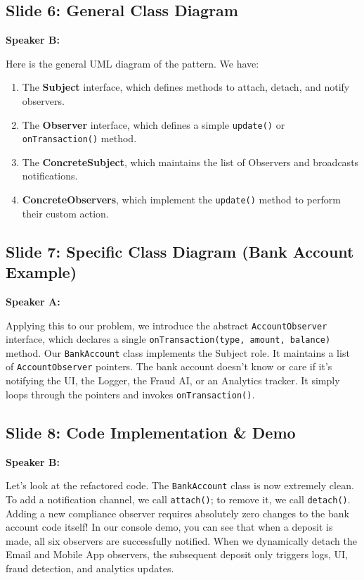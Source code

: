 \documentclass[11pt,a4paper]{article}
\newenvironment{dialogue}[1]{
    \begin{mdframed}[linecolor=gray!40,backgroundcolor=gray!5,roundcorner=5pt,innerleftmargin=10pt,innerrightmargin=10pt,innertopmargin=8pt,innerbottommargin=8pt]
    \textbf{#1:}
}{
    \end{mdframed}
}
\begin{document}
\subsection*{Slide 6: General Class Diagram}
\begin{dialogue}{Speaker B}
    Here is the general UML diagram of the pattern. We have:
    \begin{enumerate}
        \item The \textbf{Subject} interface, which defines methods to attach, detach, and notify observers.
        \item The \textbf{Observer} interface, which defines a simple \texttt{update()} or \texttt{onTransaction()} method.
        \item The \textbf{ConcreteSubject}, which maintains the list of Observers and broadcasts notifications.
        \item \textbf{ConcreteObservers}, which implement the \texttt{update()} method to perform their custom action.
    \end{enumerate}
\end{dialogue}

\subsection*{Slide 7: Specific Class Diagram (Bank Account Example)}
\begin{dialogue}{Speaker A}
    Applying this to our problem, we introduce the abstract \texttt{AccountObserver} interface, which declares a single \texttt{onTransaction(type, amount, balance)} method. 
    Our \texttt{BankAccount} class implements the Subject role. It maintains a list of \texttt{AccountObserver} pointers. The bank account doesn't know or care if it's notifying the UI, the Logger, the Fraud AI, or an Analytics tracker. It simply loops through the pointers and invokes \texttt{onTransaction()}.
\end{dialogue}

\newpage
\subsection*{Slide 8: Code Implementation \& Demo}
\begin{dialogue}{Speaker B}
    Let's look at the refactored code. The \texttt{BankAccount} class is now extremely clean. To add a notification channel, we call \texttt{attach()}; to remove it, we call \texttt{detach()}. 
    Adding a new compliance observer requires absolutely zero changes to the bank account code itself! In our console demo, you can see that when a deposit is made, all six observers are successfully notified. When we dynamically detach the Email and Mobile App observers, the subsequent deposit only triggers logs, UI, fraud detection, and analytics updates.
\end{dialogue}
\end{document}
